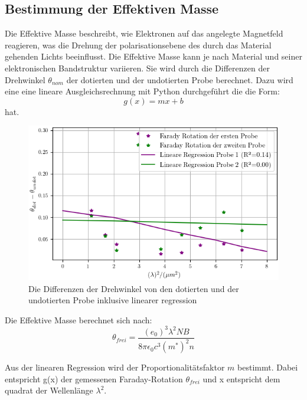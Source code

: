 \subsection{Bestimmung der Effektiven Masse}
Die Effektive Masse beschreibt, wie Elektronen auf das angelegte Magnetfeld reagieren, was die Drehung der
polarisationsebene des durch das Material gehenden Lichts beeinflusst. Die Effektive Masse kann je nach Material 
und seiner elektronischen Bandstruktur variieren. Sie wird durch die Differenzen der Drehwinkel $\theta_{nom}$ 
der dotierten und der undotierten Probe berechnet. Dazu wird eine eine lineare Ausgleichsrechnung mit Python 
durchgeführt die die Form:
\begin{equation}
g(x)=mx+b
\label{eq:lineareform}
\end{equation}
hat.

\begin{figure}
    \centering
    \includegraphics[width=\textwidth]{Bilder/lineareregression.png}
    \caption{Die Differenzen der Drehwinkel von den dotierten und der undotierten Probe inklusive linearer regression}
    \label{fig:regression}
\end{figure}

Die Effektive Masse berechnet sich nach:
\begin{equation}
    \theta_{frei}=\frac{(e_0)^3 \lambda^2 NB}{8 \pi\epsilon_0 c^3 (m^*)^2 n}
\label{eq:masse}
\end{equation}

Aus der linearen Regression wird der Proportionalitätsfaktor $m$  bestimmt.
Dabei entspricht g(x) der gemessenen Faraday-Rotation $\theta_{frei}$ und x
entspricht dem quadrat der Wellenlänge $\lambda^2$.

